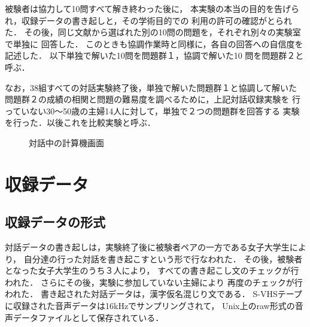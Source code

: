 被験者は協力して10問すべて解き終わった後に，
本実験の本当の目的を告げられ，収録データの書き起しと，その学術目的での
利用の許可の確認がとられた．
その後，同じ文献から選ばれた別の10問の問題を，それぞれ別々の実験室で単独に
回答した．
このときも協調作業時と同様に，各自の回答への自信度を記述した．
以下単独で解いた10問を問題群１，協調で解いた10
問を問題群２と呼ぶ．

なお，38組すべての対話実験終了後，単独で解いた問題群１と協調して解いた
問題群２の成績の相関と問題の難易度を調べるために，上記対話収録実験を
行っていない30〜50歳の主婦14人に対して，単独で２つの問題群を回答する
実験を行った．以後これを比較実験と呼ぶ．




\begin{figure}
\begin{center}
\end{center}
\caption{対話中の計算機画面}
\end{figure}

\section{収録データ}
\subsection{収録データの形式}

対話データの書き起しは，実験終了後に被験者ペアの一方である女子大学生により，
自分達の行った対話を書き起こすという形で行なわれた．
その後，被験者となった女子大学生のうち３人により，
すべての書き起こし文のチェックが行われた．
さらにその後，実験に参加していない主婦により
再度のチェックが行われた．
書き起された対話データは，漢字仮名混じり文である．
S-VHSテープに収録された音声データは16kHzでサンプリングされて，
Unix上のraw形式の音声データファイルとして保存されている．

